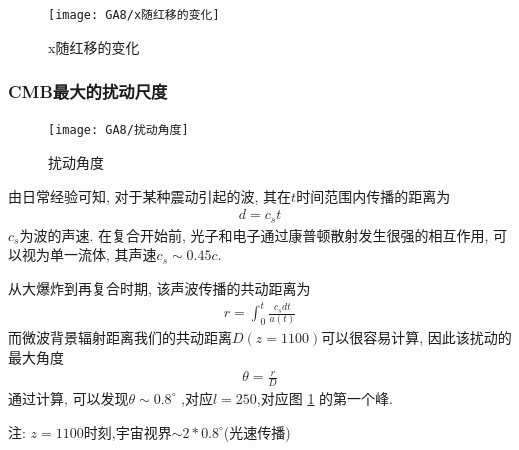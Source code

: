 \begin{figure}[!htb]
    \centering
    \texttt{[image: GA8/x随红移的变化]}
    \caption{x随红移的变化}
\end{figure}

\subsubsection{CMB最大的扰动尺度}
\begin{figure}[!htb]
    \centering
    \texttt{[image: GA8/扰动角度]}
    \caption{扰动角度}
    \label{扰动角度}
\end{figure}

由日常经验可知, 对于某种震动引起的波, 其在$t$时间范围内传播的距离为
\begin{align*}
    d=c_s t
\end{align*}
$c_s$为波的声速. 在复合开始前, 光子和电子通过康普顿散射发生很强的相互作用, 可以视为单一流体, 其声速$c_s\sim 0.45 c$. 

从大爆炸到再复合时期, 该声波传播的共动距离为
\begin{align*}
    r=\int_0^t\frac{c_s dt}{a(t)}
\end{align*}
而微波背景辐射距离我们的共动距离$D(z=1100)$可以很容易计算, 因此该扰动的最大角度
\begin{align*}
    \theta=\frac{r}{D}
\end{align*}
通过计算, 可以发现$\theta\sim 0.8^{\circ}$ ,对应$l=250$,对应图 \ref{扰动角度} 的第一个峰. 

注: $z=1100$时刻,宇宙视界$\sim2* 0.8^{\circ} $(光速传播)


